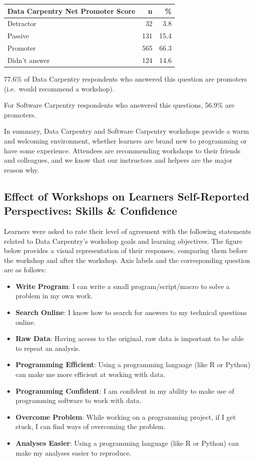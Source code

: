 \documentclass[]{article}
\providecommand{\tightlist}{%
  \setlength{\itemsep}{0pt}\setlength{\parskip}{0pt}}
\begin{document}
\begin{longtable}[]{@{}lrr@{}}
\toprule
Data Carpentry Net Promoter Score & n & \%\tabularnewline
\midrule
\endhead
Detractor & 32 & 3.8\tabularnewline
Passive & 131 & 15.4\tabularnewline
Promoter & 565 & 66.3\tabularnewline
Didn't answer & 124 & 14.6\tabularnewline
\bottomrule
\end{longtable}

77.6\% of Data Carpentry respondents who answered this question are
promoters (i.e.~would recommend a workshop).

For Software Carpentry respondents who answered this questions, 56.9\%
are promoters.

In summary, Data Carpentry and Software Carpentry workshops provide a
warm and welcoming environment, whether learners are brand new to
programming or have some experience. Attendees are recommending
workshops to their friends and colleagues, and we know that our
instructors and helpers are the major reason why.

\subsection{Effect of Workshops on Learners Self-Reported Perspectives:
Skills \&
Confidence}\label{effect-of-workshops-on-learners-self-reported-perspectives-skills-confidence}

Learners were asked to rate their level of agreement with the following
statements related to Data Carpentry's workshop goals and learning
objectives. The figure below provides a visual representation of their
responses, comparing them before the workshop and after the workshop.
Axis labels and the corresponding question are as follows:

\begin{itemize}
\tightlist
\item
  \textbf{Write Program}: I can write a small program/script/macro to
  solve a problem in my own work.
\item
  \textbf{Search Online}: I know how to search for answers to my
  technical questions online.
\item
  \textbf{Raw Data}: Having access to the original, raw data is
  important to be able to repeat an analysis.
\item
  \textbf{Programming Efficient}: Using a programming language (like R
  or Python) can make me more efficient at working with data.
\item
  \textbf{Programming Confident}: I am confident in my ability to make
  use of programming software to work with data.
\item
  \textbf{Overcome Problem}: While working on a programming project, if
  I get stuck, I can find ways of overcoming the problem.
\item
  \textbf{Analyses Easier}: Using a programming language (like R or
  Python) can make my analyses easier to reproduce.
\end{itemize}
\end{document}

